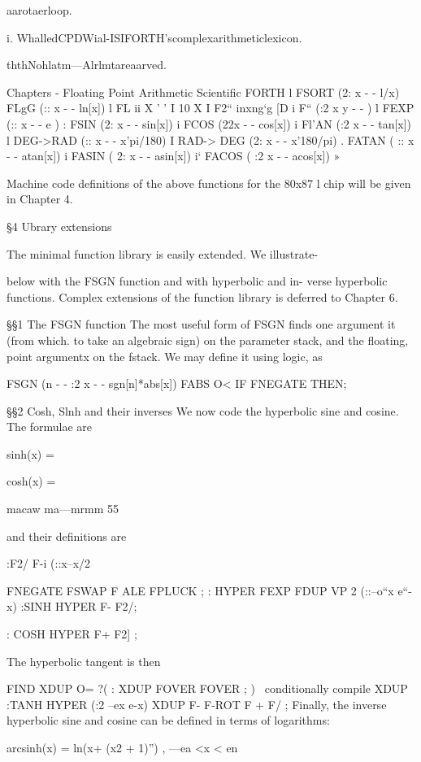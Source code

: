 aarotaerloop.

i. WhalledCPDWial-ISIFORTH'scomplexarithmeticlexicon.

ththNohlatm—Alrlmtareaarved.

 

Chapters - Floating Point Arithmetic Scientific FORTH
l
FSORT (2: x - - l/x)
FLgG (:: x - - ln[x]) l
FL ii X ' ' I 10 X I
F2“ inxng‘g [D i
F“ (:2 x y - - ) l
FEXP (:: x - - e ) :
FSIN (2: x - - sin[x]) i
FCOS (22x - - cos[x]) i
Fl'AN (:2 x - - tan[x]) l
DEG->RAD (:: x - - x’pi/180) I
RAD-> DEG (2: x - - x'180/pi) .
FATAN ( :: x - - atan[x]) i
FASIN ( 2: x - - asin[x]) i‘
FACOS ( :2 x - - acos[x]) »

Machine code deﬁnitions of the above functions for the 80x87 l
chip will be given in Chapter 4.

§4 Ubrary extensions

The minimal function library is easily extended. We illustrate-

below with the FSGN function and with hyperbolic and in-
verse hyperbolic functions. Complex extensions of the function
library is deferred to Chapter 6.

§§1 The FSGN function
The most useful form of FSGN ﬁnds one argument it (from which.
to take an algebraic sign) on the parameter stack, and the ﬂoating,
point argumentx on the fstack. We may deﬁne it using logic, as

FSGN (n - - :2 x - - sgn[n]*abs[x])
FABS O< IF FNEGATE THEN;

§§2 Cosh, Slnh and their inverses
We now code the hyperbolic sine and cosine. The formulae are

sinh(x) = %

cosh(x) = %

macaw ma—mrmm 55

and their deﬁnitions are

:F2/ F-i (::x--x/2

FNEGATE FSWAP F ALE FPLUCK ;
: HYPER FEXP FDUP VP 2 (::--o“x e“-x)
:SINH HYPER F- F2/;

: COSH HYPER F+ F2] ;

The hyperbolic tangent is then

FIND XDUP O= ?( : XDUP FOVER FOVER ; )
\ conditionally compile XDUP
:TANH HYPER (:2 --ex e-x)
XDUP F- F-ROT F + F/ ;
Finally, the inverse hyperbolic sine and cosine can be deﬁned in
terms of logarithms:

arcsinh(x) = ln(x+ (x2 + 1)”) , —ea <x < en

